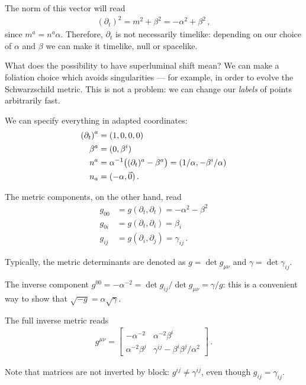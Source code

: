 \documentclass[main.tex]{subfiles}
\begin{document}
The norm of this vector will read
%
\begin{align}
(\partial_{t})^{2} = m^2 + \beta^2 = - \alpha^2 + \beta^2
\,,
\end{align}
%
since \(m^a = n^a \alpha \).
Therefore, \(\partial_{t}\) is not necessarily timelike: depending on our choice of \(\alpha \) and \(\beta \) we can make it timelike, null or spacelike. 

What does the possibility to have superluminal shift mean? 
We can make a foliation choice which avoids singularities --- for example, in order to evolve the Schwarzschild metric.
This is not a problem: we can change our \emph{labels} of points arbitrarily fast.

We can specify everything in adapted coordinates: 
%
\begin{align}
\qty(\partial_{t})^{a} &= (1, 0, 0, 0)  \\
\beta^{a } &= (0, \beta^{i})  \\
n^a &= \alpha^{-1} \qty( (\partial_{t})^{a} - \beta^{a}) = (1/\alpha , - \beta^{i} / \alpha )  \\
n_a &= (- \alpha , \vec{0})
\,.
\end{align}

The metric components, on the other hand, read 
%
\begin{align}
g_{00} &= g( \partial_{t}, \partial_{t}) = - \alpha^2 - \beta^2  \\
g_{0i} &= g(\partial_{t}, \partial_{i}) = \beta_{i}  \\
g_{ij} &= g (\partial_{i}, \partial_{j}) = \gamma_{ij}
\,.
\end{align}

Typically, the metric determinants are denoted as \(g = \det g_{\mu \nu }\) and \(\gamma = \det \gamma_{ij}\). 

The inverse component \(g^{00} = - \alpha^{-2} = \det g_{ij} / \det g_{\mu \nu } = \gamma / g\): this is a convenient way to show that \(\sqrt{-g} = \alpha \sqrt{ \gamma }\).

The full inverse metric reads 
%
\begin{align}
g^{\mu \nu } = \left[\begin{array}{cc}
- \alpha^{-2} & \alpha^{-2} \beta^{i} \\ 
\alpha^{-2} \beta^{j} & \gamma^{ij} - \beta^{i} \beta^{j} / \alpha^2
\end{array}\right]
\,.
\end{align}

Note that matrices are not inverted by block: \(g^{ij} \neq \gamma^{ij}\), even though \(g_{ij} = \gamma_{ij}\). 
\end{document}
